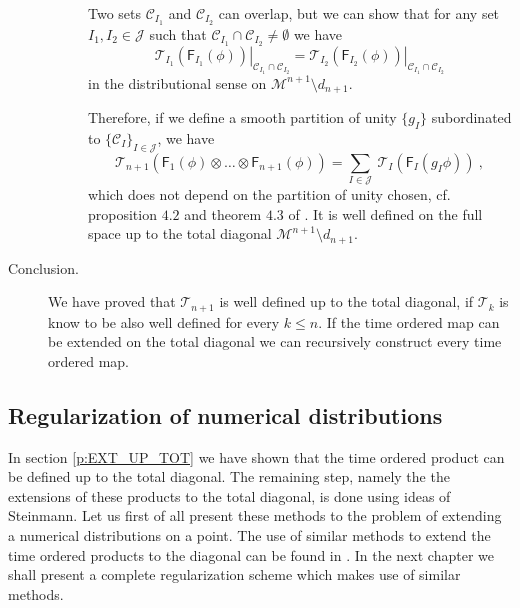 \documentclass[11pt]{book}
\newcommand{\Ccal}{\mathcal{C}}
\newcommand{\Jcal}{\mathcal{J}}
\newcommand{\Mcal}{\mathcal{M}}
\newcommand{\Tcal}{\mathcal{T}}
\newcommand{\Fsf}{\mathsf{F}}
\theoremstyle{break}
\begin{document}
\begin{description}
\begin{description}
Two sets $\Ccal_{I_1}$ and $\Ccal_{I_2}$ can overlap, but we can show \cite[proposition 4.2]{BF_2000} that for any set $I_1 , I_2 \in \Jcal$ such that $\Ccal_{I_1} \cap \Ccal_{I_2} \neq \emptyset$ we have 
%
\begin{equation*}
\left. \Tcal_{I_1}\left(\Fsf_{I_1}(\phi)\right) \right|_{\Ccal_{I_1} \cap \Ccal_{I_2}} = \left. \Tcal_{I_2}\left(\Fsf_{I_2}(\phi)\right) \right|_{\Ccal_{I_1} \cap \Ccal_{I_2}}
\end{equation*}
%
in the distributional sense on $\Mcal^{n+1}\setminus d_{n+1}$.


Therefore, if we define a smooth partition of unity $\{ g_I\}$  subordinated to $\{\Ccal_I\}_{I\in\Jcal}$, we have
%
\begin{equation*}
\Tcal_{n+1}\left(\Fsf_1(\phi) \otimes \dots \otimes \Fsf_{n+1}(\phi) \right) = \sum_{I\in\Jcal} \  \Tcal_{I}\left(\Fsf_I(g_I\phi)\right) \ , 
\end{equation*}
%
which does not depend on the partition of unity chosen, cf. proposition $4.2$ and theorem $4.3$ of \cite{BF_2000}. It is well defined on the full space up to the total diagonal $\Mcal^{n+1} \setminus d_{n+1}$.


\end{description}


\item[Conclusion.] We have proved that $\Tcal_{n+1}$ is well defined up to the total diagonal, if $\Tcal_k$ is know to be also well defined for every $k\leq n$. If the time ordered map can be extended on the total diagonal we can recursively construct every time ordered map.


\end{description}


\subsection{Regularization of numerical distributions}
\label{p:REG_NUMERRIC}


In section \ref{p:EXT_UP_TOT} we have shown that the time ordered product can be defined up to the total diagonal. The remaining step, namely the the extensions of these products to the total diagonal, is done using ideas of Steinmann. Let us first of all present these methods to the problem of extending a numerical distributions on a point. The use of similar methods to extend the time ordered products to the diagonal can be found in \cite{BF_2000}. In the next chapter we shall present a complete regularization scheme which makes use of similar methods.
\end{document}
